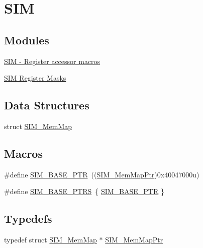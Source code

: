 \hypertarget{group___s_i_m___peripheral}{}\section{S\+I\+M}
\label{group___s_i_m___peripheral}
\subsection*{Modules}
\begin{DoxyCompactItemize}
\item 
\hyperlink{group___s_i_m___register___accessor___macros}{S\+I\+M -\/ Register accessor macros}
\item 
\hyperlink{group___s_i_m___register___masks}{S\+I\+M Register Masks}
\end{DoxyCompactItemize}
\subsection*{Data Structures}
\begin{DoxyCompactItemize}
\item 
struct \hyperlink{struct_s_i_m___mem_map}{S\+I\+M\+\_\+\+Mem\+Map}
\end{DoxyCompactItemize}
\subsection*{Macros}
\begin{DoxyCompactItemize}
\item 
\#define \hyperlink{group___s_i_m___peripheral_ga719ec5df95fbb5732438f794f2cccf3c}{S\+I\+M\+\_\+\+B\+A\+S\+E\+\_\+\+P\+T\+R}~((\hyperlink{group___s_i_m___peripheral_ga708a122e8ca55082e0cf67cab6a77d02}{S\+I\+M\+\_\+\+Mem\+Map\+Ptr})0x40047000u)
\item 
\#define \hyperlink{group___s_i_m___peripheral_ga2fd213a3b9fc7d761ab0cdeb74c34f91}{S\+I\+M\+\_\+\+B\+A\+S\+E\+\_\+\+P\+T\+R\+S}~\{ \hyperlink{group___s_i_m___peripheral_ga719ec5df95fbb5732438f794f2cccf3c}{S\+I\+M\+\_\+\+B\+A\+S\+E\+\_\+\+P\+T\+R} \}
\end{DoxyCompactItemize}
\subsection*{Typedefs}
\begin{DoxyCompactItemize}
\item 
typedef struct \hyperlink{struct_s_i_m___mem_map}{S\+I\+M\+\_\+\+Mem\+Map} $\ast$ \hyperlink{group___s_i_m___peripheral_ga708a122e8ca55082e0cf67cab6a77d02}{S\+I\+M\+\_\+\+Mem\+Map\+Ptr}
\end{DoxyCompactItemize}


